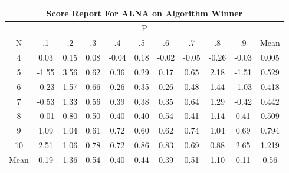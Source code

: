 \documentclass[11pt,a4paper]{report}
\begin{document}
\begin{longtable}{ | c || c | c | c | c | c | c | c | c | c || c |}
\hline
\multicolumn{11}{|c|}{ Score Report For ALNA on Algorithm Winner} \\
\hline
\multicolumn{11}{|c|}{ P } \\
\hline
N & .1 & .2 & .3 & .4 & .5 & .6 & .7 & .8 & .9 & Mean\\
 \hline
 \hline
 \endhead
  4 &  \cellcolor[HTML]{FFFFFF} 0.03 &  \cellcolor[HTML]{FFFFFF} 0.15 &  \cellcolor[HTML]{FFFFFF} 0.08 &  \cellcolor[HTML]{FFFFFF} -0.04 &  \cellcolor[HTML]{F7F7FF} 0.18 &  \cellcolor[HTML]{FFFFFF} -0.02 &  \cellcolor[HTML]{FFFFFF} -0.05 &  \cellcolor[HTML]{FFF7F7} -0.26 &  \cellcolor[HTML]{FFFFFF} -0.03 & 0.005 \\
  5 &  \cellcolor[HTML]{FFD7D7} -1.55 &  \cellcolor[HTML]{A7A7FF} 3.56 &  \cellcolor[HTML]{EFEFFF} 0.62 &  \cellcolor[HTML]{F7F7FF} 0.36 &  \cellcolor[HTML]{F7F7FF} 0.29 &  \cellcolor[HTML]{F7F7FF} 0.17 &  \cellcolor[HTML]{EFEFFF} 0.65 &  \cellcolor[HTML]{C7C7FF} 2.18 &  \cellcolor[HTML]{FFD7D7} -1.51 & 0.529 \\
  6 &  \cellcolor[HTML]{FFF7F7} -0.23 &  \cellcolor[HTML]{D7D7FF} 1.57 &  \cellcolor[HTML]{EFEFFF} 0.66 &  \cellcolor[HTML]{F7F7FF} 0.26 &  \cellcolor[HTML]{F7F7FF} 0.35 &  \cellcolor[HTML]{F7F7FF} 0.26 &  \cellcolor[HTML]{EFEFFF} 0.48 &  \cellcolor[HTML]{D7D7FF} 1.44 &  \cellcolor[HTML]{FFE7E7} -1.03 & 0.418 \\
  7 &  \cellcolor[HTML]{FFEFEF} -0.53 &  \cellcolor[HTML]{DFDFFF} 1.33 &  \cellcolor[HTML]{EFEFFF} 0.56 &  \cellcolor[HTML]{F7F7FF} 0.39 &  \cellcolor[HTML]{F7F7FF} 0.38 &  \cellcolor[HTML]{F7F7FF} 0.35 &  \cellcolor[HTML]{EFEFFF} 0.64 &  \cellcolor[HTML]{DFDFFF} 1.29 &  \cellcolor[HTML]{FFF7F7} -0.42 & 0.442 \\
  8 &  \cellcolor[HTML]{FFFFFF} -0.01 &  \cellcolor[HTML]{E7E7FF} 0.80 &  \cellcolor[HTML]{EFEFFF} 0.50 &  \cellcolor[HTML]{F7F7FF} 0.40 &  \cellcolor[HTML]{F7F7FF} 0.40 &  \cellcolor[HTML]{EFEFFF} 0.54 &  \cellcolor[HTML]{F7F7FF} 0.41 &  \cellcolor[HTML]{DFDFFF} 1.14 &  \cellcolor[HTML]{F7F7FF} 0.41 & 0.509 \\
  9 &  \cellcolor[HTML]{E7E7FF} 1.09 &  \cellcolor[HTML]{E7E7FF} 1.04 &  \cellcolor[HTML]{EFEFFF} 0.61 &  \cellcolor[HTML]{EFEFFF} 0.72 &  \cellcolor[HTML]{EFEFFF} 0.60 &  \cellcolor[HTML]{EFEFFF} 0.62 &  \cellcolor[HTML]{EFEFFF} 0.74 &  \cellcolor[HTML]{E7E7FF} 1.04 &  \cellcolor[HTML]{EFEFFF} 0.69 & 0.794 \\
  10 &  \cellcolor[HTML]{BFBFFF} 2.51 &  \cellcolor[HTML]{E7E7FF} 1.06 &  \cellcolor[HTML]{EFEFFF} 0.78 &  \cellcolor[HTML]{EFEFFF} 0.72 &  \cellcolor[HTML]{E7E7FF} 0.86 &  \cellcolor[HTML]{E7E7FF} 0.83 &  \cellcolor[HTML]{EFEFFF} 0.69 &  \cellcolor[HTML]{E7E7FF} 0.88 &  \cellcolor[HTML]{BFBFFF} 2.65 & 1.219 \\
 \hline
 \hline
Mean &  \cellcolor[HTML]{F7F7FF} 0.19 &  \cellcolor[HTML]{DFDFFF} 1.36 &  \cellcolor[HTML]{EFEFFF} 0.54 &  \cellcolor[HTML]{F7F7FF} 0.40 &  \cellcolor[HTML]{F7F7FF} 0.44 &  \cellcolor[HTML]{F7F7FF} 0.39 &  \cellcolor[HTML]{EFEFFF} 0.51 &  \cellcolor[HTML]{E7E7FF} 1.10 &  \cellcolor[HTML]{FFFFFF} 0.11 &  \cellcolor[HTML]{EFEFFF} 0.56
\end{longtable}
\end{document}
